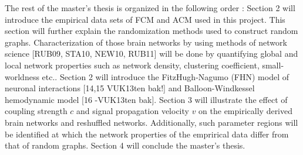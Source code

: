 The rest of the master's thesis is organized in the following order : Section 2 will introduce the empirical data sets of FCM and ACM used in this project. This section will further explain the randomization methods used to construct random graphs. Characterization of those brain networks by using methods of network science [RUB09, STA10, NEW10, RUB11] will be done by quantifying global and local network properties such as network density, clustering coefficient, small-worldness etc.. Section 2 will introduce the FitzHugh-Nagumo (FHN) model of neuronal interactions [14,15 VUK13ten bak!] and Balloon-Windkessel hemodynamic model [16 -VUK13ten bak]. Section 3 will illustrate the effect of coupling strength $c$ and signal propagation velocity $v$ on the empirically derived brain networks and reshuffled networks. Additionally, such parameter regions will be identified at which the network properties of the emprirical data differ from that of random graphs. Section 4 will conclude the master's thesis. 

 
 

